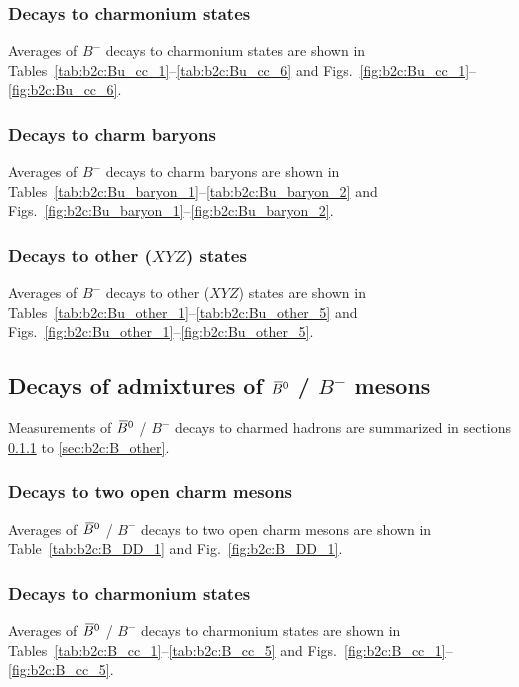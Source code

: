 \subsubsection{Decays to charmonium states}
\label{sec:b2c:Bu_cc}
Averages of $B^-$ decays to charmonium states are shown in Tables~\ref{tab:b2c:Bu_cc_1}--\ref{tab:b2c:Bu_cc_6} and Figs.~\ref{fig:b2c:Bu_cc_1}--\ref{fig:b2c:Bu_cc_6}.

\subsubsection{Decays to charm baryons}
\label{sec:b2c:Bu_baryon}
Averages of $B^-$ decays to charm baryons are shown in Tables~\ref{tab:b2c:Bu_baryon_1}--\ref{tab:b2c:Bu_baryon_2} and Figs.~\ref{fig:b2c:Bu_baryon_1}--\ref{fig:b2c:Bu_baryon_2}.

\subsubsection{Decays to other ($XYZ$) states}
\label{sec:b2c:Bu_other}
Averages of $B^-$ decays to other ($XYZ$) states are shown in Tables~\ref{tab:b2c:Bu_other_1}--\ref{tab:b2c:Bu_other_5} and Figs.~\ref{fig:b2c:Bu_other_1}--\ref{fig:b2c:Bu_other_5}.


\subsection{Decays of admixtures of $\kern 0.18em\overline{\kern -0.18em B}{}^0$ / $B^-$ mesons}
\label{sec:b2c:B}
Measurements of $\kern 0.18em\overline{\kern -0.18em B}{}^0$ / $B^-$ decays to charmed hadrons are summarized in sections \ref{sec:b2c:B_DD} to \ref{sec:b2c:B_other}.

\subsubsection{Decays to two open charm mesons}
\label{sec:b2c:B_DD}
Averages of $\kern 0.18em\overline{\kern -0.18em B}{}^0$ / $B^-$ decays to two open charm mesons are shown in Table~\ref{tab:b2c:B_DD_1} and Fig.~\ref{fig:b2c:B_DD_1}.

\subsubsection{Decays to charmonium states}
\label{sec:b2c:B_cc}
Averages of $\kern 0.18em\overline{\kern -0.18em B}{}^0$ / $B^-$ decays to charmonium states are shown in Tables~\ref{tab:b2c:B_cc_1}--\ref{tab:b2c:B_cc_5} and Figs.~\ref{fig:b2c:B_cc_1}--\ref{fig:b2c:B_cc_5}.

